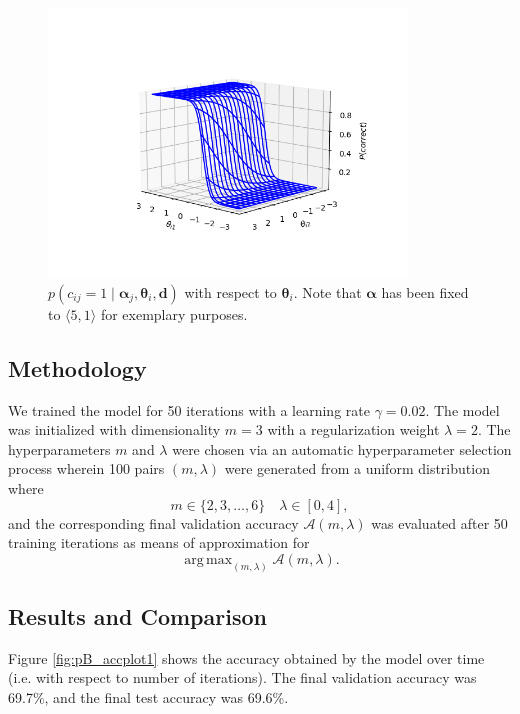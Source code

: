 \documentclass[10pt]{article}
\renewcommand{\bf}[1]{\mathbf{#1}}
\DeclareMathOperator*{\argmax}{arg\,max}
\begin{document}
\begin{figure}[h!]
    \centering
    \includegraphics[width=0.85\textwidth]{final/3dplot_2.png}
    \caption{$p(c_{ij} = 1\mid \bm\alpha_j,\bm\theta_i,\bf d)$ with respect to $\bm \theta_i$. Note that $\bm\alpha$ has been fixed to $\langle 5, 1 \rangle$ for exemplary purposes.}
    \label{fig:pB_3dplot2}
\end{figure}

\newpage
\subsection*{Methodology}

We trained the model for 50 iterations with a learning rate $\gamma=0.02$. The model was initialized with dimensionality $m=3$ with a regularization weight $\lambda=2$. The hyperparameters $m$ and $\lambda$ were chosen via an automatic hyperparameter selection process wherein 100 pairs $(m,\lambda)$ were generated from a uniform distribution where
$$
    m\in\{2, 3,\dots,6\}\quad \lambda\in[0, 4],
$$
and the corresponding final validation accuracy $\mathcal A(m,\lambda)$ was evaluated after 50 training iterations as means of approximation for
$$
    \argmax_{(m,\lambda)} \mathcal A(m,\lambda).
$$

\subsection*{Results and Comparison}
Figure \ref{fig:pB_accplot1} shows the accuracy obtained by the model over time (i.e. with respect to number of iterations). The final validation accuracy was 69.7\%, and the final test accuracy was 69.6\%.

\spacer
\end{document}
